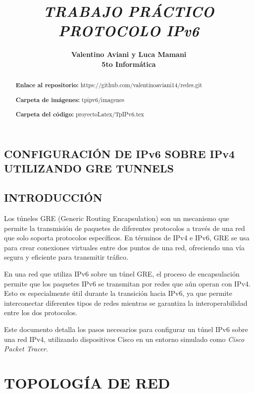 \documentclass[12pt]{article}
\title{\textbf{\textit{TRABAJO PRÁCTICO PROTOCOLO IPv6}}}
\author{\textbf{Valentino Aviani y Luca Mamani} \\ \textbf{5to Informática}}
\begin{document}
	
	\maketitle 
	
	\begin{abstract}
		\textbf{Enlace al repositorio:} https://github.com/valentinoaviani14/redes.git 
		
		\textbf{Carpeta de imágenes:} tpipv6/imagenes
		
		\textbf{Carpeta del código:} proyectoLatex/TpIPv6.tex
	\end{abstract}
	
	\tableofcontents
	
	\newpage  %
	
	\begin{center}
		\section{CONFIGURACIÓN DE IPv6 SOBRE IPv4 UTILIZANDO GRE TUNNELS}
	\end{center}
	
	\subsection{INTRODUCCIÓN}
	{\large Los túneles GRE (Generic Routing Encapsulation) son un mecanismo que permite la transmisión de paquetes de diferentes protocolos a través de una red que solo soporta protocolos específicos. En términos de IPv4 e IPv6, GRE se usa para crear conexiones virtuales entre dos puntos de una red, ofreciendo una vía segura y eficiente para transmitir tráfico.}
	
	{\large En una red que utiliza IPv6 sobre un túnel GRE, el proceso de encapsulación permite que los paquetes IPv6 se transmitan por redes que aún operan con IPv4. Esto es especialmente útil durante la transición hacia IPv6, ya que permite interconectar diferentes tipos de redes mientras se garantiza la interoperabilidad entre los dos protocolos.}
	
	{\large Este documento detalla los pasos necesarios para configurar un túnel IPv6 sobre una red IPv4, utilizando dispositivos Cisco en un entorno simulado como \textit{Cisco Packet Tracer}.}
	
	\section{TOPOLOGÍA DE RED}
	
\end{document}
